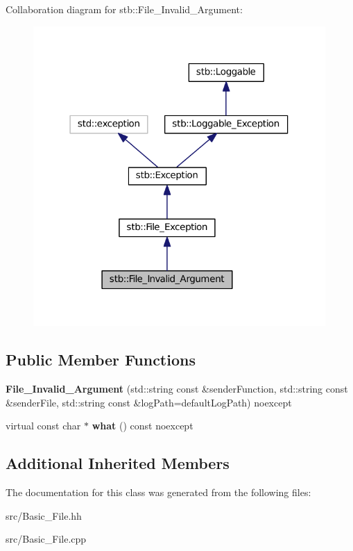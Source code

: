 Collaboration diagram for stb\+:\+:File\+\_\+\+Invalid\+\_\+\+Argument\+:
\nopagebreak
\begin{figure}[H]
\begin{center}
\leavevmode
\includegraphics[width=316pt]{classstb_1_1File__Invalid__Argument__coll__graph}
\end{center}
\end{figure}
\subsection*{Public Member Functions}
\begin{DoxyCompactItemize}
\item 
\hypertarget{classstb_1_1File__Invalid__Argument_a4e3888a2c430a44ad54a23d93337433d}{{\bfseries File\+\_\+\+Invalid\+\_\+\+Argument} (std\+::string const \&sender\+Function, std\+::string const \&sender\+File, std\+::string const \&log\+Path=default\+Log\+Path) noexcept}\label{classstb_1_1File__Invalid__Argument_a4e3888a2c430a44ad54a23d93337433d}

\item 
\hypertarget{classstb_1_1File__Invalid__Argument_ad0ebc1bdfc32fa6f278e1ae7b391de15}{virtual const char $\ast$ {\bfseries what} () const noexcept}\label{classstb_1_1File__Invalid__Argument_ad0ebc1bdfc32fa6f278e1ae7b391de15}

\end{DoxyCompactItemize}
\subsection*{Additional Inherited Members}


The documentation for this class was generated from the following files\+:\begin{DoxyCompactItemize}
\item 
src/Basic\+\_\+\+File.\+hh\item 
src/Basic\+\_\+\+File.\+cpp\end{DoxyCompactItemize}

